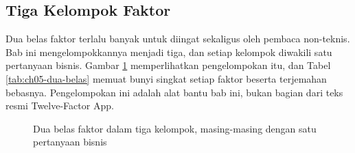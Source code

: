 \subsection{Tiga Kelompok Faktor}

Dua belas faktor terlalu banyak untuk diingat sekaligus oleh pembaca non-teknis. Bab ini
mengelompokkannya menjadi tiga, dan setiap kelompok diwakili satu pertanyaan bisnis. Gambar
\ref{fig:ch05-tiga-kelompok} memperlihatkan pengelompokan itu, dan Tabel
\ref{tab:ch05-dua-belas} memuat bunyi singkat setiap faktor beserta terjemahan bebasnya.
Pengelompokan ini adalah alat bantu bab ini, bukan bagian dari teks resmi Twelve-Factor App.

\begin{figure}[!htb]
  \centering
  
  \caption{Dua belas faktor dalam tiga kelompok, masing-masing dengan satu pertanyaan
           bisnis}
  \label{fig:ch05-tiga-kelompok}
\end{figure}

